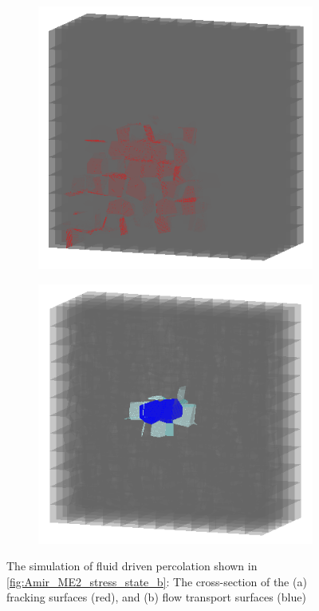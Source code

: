\begin{figure}[!ht]
\begin{subfigure}[c]{0.48\textwidth}
\includegraphics[width=1\textwidth]{figures/Amir_ME2_LEM_b_model_Fracture.png}
\subcaption{}
\label{fig:Amir_ME2_LEM_b_model_Fracture}
\end{subfigure}
\hfill
\begin{subfigure}[c]{0.48\textwidth}
\includegraphics[width=1\textwidth]{figures/Amir_ME2_LEM_b_model_Flow.png}
\subcaption{}
\label{fig:Amir_ME2_LEM_b_model_Flow}
\end{subfigure}
\caption{ The simulation of fluid driven percolation shown in \ref{fig:Amir_ME2_stress_state_b}: The cross-section of the (a) fracking surfaces (red), and (b) flow transport surfaces (blue)}
\end{figure}
